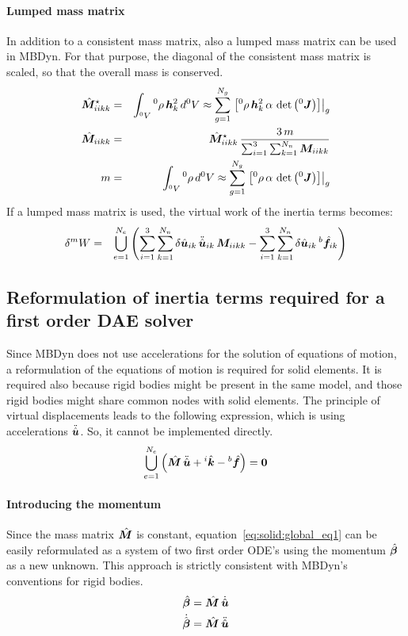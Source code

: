 \paragraph{Lumped mass matrix}
In addition to a consistent mass matrix, also a lumped mass matrix can be used in MBDyn.
For that purpose, the diagonal of the consistent mass matrix is scaled, so that the overall mass is conserved.
\begin{eqnarray}
\hat{\bm{M}}_{iikk}^{\star} & = & \int_{^0V} {^0}\rho \, \bm{h}_k^2 \, d^0V \approx \sum_{g=1}^{N_g} \left.\left[{^0}\rho \, \bm{h}_k^2 \, \alpha \, \det{\left({^0}\bm{J}\right)}\right]\right\vert_{g} \\
\hat{\bm{M}}_{iikk}&=&\hat{\bm{M}}_{iikk}^{\star} \, \frac{3\,m}{\sum_{i=1}^3\sum_{k=1}^{N_n}\bm{M}_{iikk}} \\
m&=&\int_{^0V}{^0}\rho\,d{^0V} \approx \sum_{g=1}^{N_g} \left.\left[{^0}\rho \, \alpha \, \det{\left(^0\bm{J}\right)}\right]\right\vert_{g}
\end{eqnarray}
If a lumped mass matrix is used, the virtual work of the inertia terms becomes:
\begin{eqnarray}
\delta^{m}W & = & \bigcup_{e=1}^{N_e}\left(\sum_{i=1}^3\sum_{k=1}^{N_n}\delta\hat{\bm{u}}_{ik} \, \ddot{\hat{\bm{u}}}_{ik} \, \bm{M}_{iikk}
 - \sum_{i=1}^3\sum_{k=1}^{N_n} \delta\hat{\bm{u}}_{ik} \, {^b}\hat{\bm{f}}_{ik}\right)
\end{eqnarray}

\subsection{Reformulation of inertia terms required for a first order DAE solver}
Since MBDyn does not use accelerations for the solution of equations of motion, a reformulation of the equations of motion is required for solid elements.
It is required also because rigid bodies might be present in the same model, and those rigid bodies might share common nodes with solid elements.
The principle of virtual displacements leads to the following expression, which is using accelerations $\ddot{\hat{\bm{u}}}$.
So, it cannot be implemented directly.
\begin{eqnarray}
\bigcup_{e=1}^{N_e} \left(\hat{\bm{M}} \, \ddot{\hat{\bm{u}}} + {^i}\hat{\bm{k}} - {^b}\hat{\bm{f}}\right) = \bm{0} \label{eq:solid:global_eq1}
\end{eqnarray}

\paragraph{Introducing the momentum}
Since the mass matrix $\hat{\bm{M}}$ is constant,
equation~\ref{eq:solid:global_eq1} can be easily reformulated as a system of two first order ODE's
using the momentum $\hat{\bm{\beta}}$ as a new unknown.
This approach is strictly consistent with MBDyn's conventions for rigid bodies.
\begin{eqnarray}
\hat{\bm{\beta}}=\hat{\bm{M}}\,\dot{\hat{\bm{u}}} \label{eq:solid:beta} \\
\dot{\hat{\bm{\beta}}}=\hat{\bm{M}}\,\ddot{\hat{\bm{u}}} \label{eq:solid:betadot}
\end{eqnarray}


